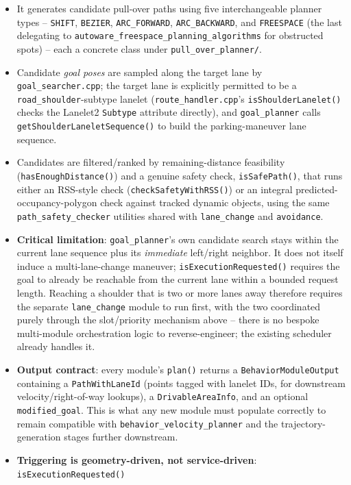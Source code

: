 \documentclass[11pt]{article}
\newcommand{\code}[1]{\texttt{#1}}
\newcommand{\pkg}[1]{\texttt{#1}}
\begin{document}
\begin{itemize}[leftmargin=1.4em]
  \item It generates candidate pull-over paths using five interchangeable planner types --
  \code{SHIFT}, \code{BEZIER}, \code{ARC\_FORWARD}, \code{ARC\_BACKWARD}, and \code{FREESPACE}
  (the last delegating to \pkg{autoware\_freespace\_planning\_algorithms} for obstructed spots) --
  each a concrete class under \code{pull\_over\_planner/}.
  \item Candidate \emph{goal poses} are sampled along the target lane by \code{goal\_searcher.cpp};
  the target lane is explicitly permitted to be a \code{road\_shoulder}-subtype lanelet
  (\code{route\_handler.cpp}'s \code{isShoulderLanelet()} checks the Lanelet2
  \code{Subtype} attribute directly), and \pkg{goal\_planner} calls
  \code{getShoulderLaneletSequence()} to build the parking-maneuver lane sequence.
  \item Candidates are filtered/ranked by remaining-distance feasibility
  (\code{hasEnoughDistance()}) and a genuine safety check, \code{isSafePath()}, that runs either an
  RSS-style check (\code{checkSafetyWithRSS()}) or an integral predicted-occupancy-polygon check
  against tracked dynamic objects, using the same \pkg{path\_safety\_checker} utilities shared with
  \pkg{lane\_change} and \pkg{avoidance}.
  \item \textbf{Critical limitation}: \pkg{goal\_planner}'s own candidate search stays within the
  current lane sequence plus its \emph{immediate} left/right neighbor. It does not itself induce a
  multi-lane-change maneuver; \code{isExecutionRequested()} requires the goal to already be
  reachable from the current lane within a bounded request length. Reaching a shoulder that is two
  or more lanes away therefore requires the separate \pkg{lane\_change} module to run first, with
  the two coordinated purely through the slot/priority mechanism above -- there is no bespoke
  multi-module orchestration logic to reverse-engineer; the existing scheduler already handles it.
  \item \textbf{Output contract}: every module's \code{plan()} returns a \code{BehaviorModuleOutput}
  containing a \code{PathWithLaneId} (points tagged with lanelet IDs, for downstream
  velocity/right-of-way lookups), a \code{DrivableAreaInfo}, and an optional
  \code{modified\_goal}. This is what any new module must populate correctly to remain compatible
  with \pkg{behavior\_velocity\_planner} and the trajectory-generation stages further downstream.
  \item \textbf{Triggering is geometry-driven, not service-driven}: \code{isExecutionRequested()}

\end{itemize}
\end{document}
